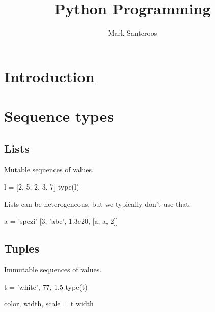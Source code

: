 \documentclass[aspectratio=1610,slidestop]{beamer}
\author{Mark Santcroos}
\title{Python Programming}
\begin{document}


\section{Introduction}
\makeTableOfContents



\section{Sequence types}

\subsection{Lists}
\begin{pframe}
Mutable sequences of values.
\begin{pyconsole}
l = [2, 5, 2, 3, 7]
type(l)
\end{pyconsole}
\medskip
Lists can be heterogeneous, but we typically don't use that.
\begin{pyconsole}
a = 'spezi'
[3, 'abc', 1.3e20, [a, a, 2]]
\end{pyconsole}
\end{pframe}


\subsection{Tuples}
\begin{pframe}
Immutable sequences of values.
\begin{pyconsole}
t = 'white', 77, 1.5
type(t)

color, width, scale = t
width
\end{pyconsole}
\end{pframe}
\end{document}
